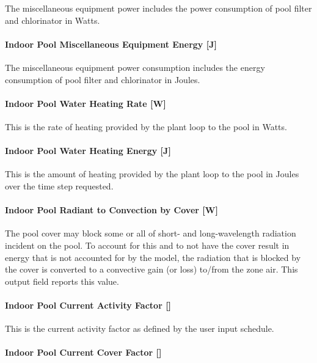 The miscellaneous equipment power includes the power consumption of pool filter and chlorinator in Watts.

\paragraph{Indoor Pool Miscellaneous Equipment Energy {[}J{]}}\label{indoor-pool-miscellaneous-equipment-energy-j}

The miscellaneous equipment power consumption includes the energy consumption of pool filter and chlorinator in Joules.

\paragraph{Indoor Pool Water Heating Rate {[}W{]}}\label{indoor-pool-water-heating-rate-w}

This is the rate of heating provided by the plant loop to the pool in Watts.

\paragraph{Indoor Pool Water Heating Energy {[}J{]}}\label{indoor-pool-water-heating-energy-j}

This is the amount of heating provided by the plant loop to the pool in Joules over the time step requested.

\paragraph{Indoor Pool Radiant to Convection by Cover {[}W{]}}\label{indoor-pool-radiant-to-convection-by-cover-w}

The pool cover may block some or all of short- and long-wavelength radiation incident on the pool. To account for this and to not have the cover result in energy that is not accounted for by the model, the radiation that is blocked by the cover is converted to a convective gain (or loss) to/from the zone air. This output field reports this value.

\paragraph{Indoor Pool Current Activity Factor {[]}}\label{indoor-pool-current-activity-factor}

This is the current activity factor as defined by the user input schedule.

\paragraph{Indoor Pool Current Cover Factor {[]}}\label{indoor-pool-current-cover-factor}

